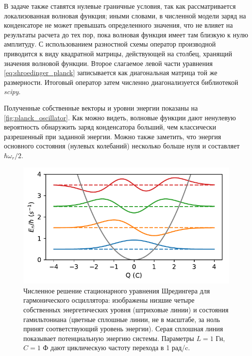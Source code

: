 \documentclass[14pt, a4paper]{extreport}
\numberwithin{equation}{section}
\begin{document}
В задаче также ставятся нулевые граничные условия, так как рассматривается локализованная волновая функция; иными словами, в численной модели заряд на конденсаторе не может превышать определенного значения, что не влияет на результаты расчета до тех пор, пока волновая функция имеет там близкую к нулю амплитуду. С использованием разностной схемы оператор производной приводится к виду квадратной матрицы, действующей на столбец, хранящий значения волновой функции. Второе слагаемое левой части уравнения \eqref{eq:shroedinger_planck} записывается как диагональная матрица той же размерности. Итоговый оператор затем численно диагонализуется библиотекой \textit{scipy}.

Полученные собственные векторы и уровни энергии показаны на \autoref{fig:planck_oscillator}. Как можно видеть, волновые функции дают ненулевую вероятность обнаружить заряд конденсатора больший, чем классически разрешенный при заданной энергии. Можно также заметить, что энергия основного состояния (нулевых колебаний) несколько больше нуля и составляет $\hbar \omega_r/2$.


\begin{figure}
	\centering
	\includegraphics[width=\linewidth/2]{planck_oscillator}
	\caption{Численное решение стационарного уравнения Шредингера для гармонического осциллятора: изображены низшие четыре собственных энергетических уровня (штриховые линии) и состояния гамильтониана (цветные сплошные линии, не в масштабе, за ноль принят соответствующий уровень энергии). Серая сплошная линия показывает потенциальную энергию системы. Параметры $L = 1$ Гн, $ C = 1$ Ф дают циклическую частоту перехода в 1 рад/c.}
	\label{fig:planck_oscillator}
\end{figure}
\end{document}
